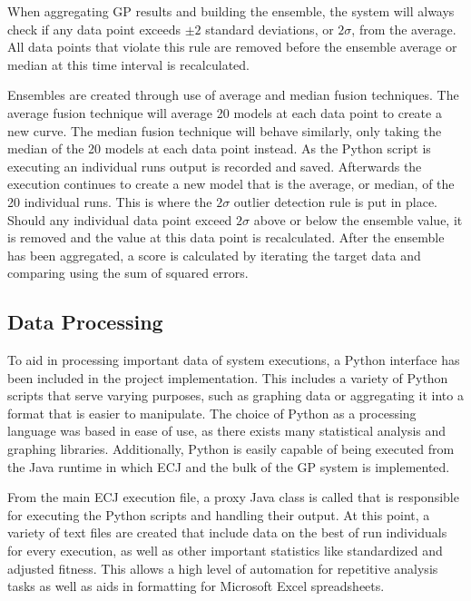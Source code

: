 \documentclass[12pt, letterpaper]{article}
\begin{document}
\textrm{ \indent When aggregating GP results and building the ensemble, the system will always check if any data point exceeds $\pm2$ standard deviations, or $2\sigma$, from the average. All data points that violate this rule are removed before the ensemble average or median at this time interval is recalculated. }

\textrm{ \indent Ensembles are created through use of average and median fusion techniques. The average fusion technique will average 20 models at each data point to create a new curve. The median fusion technique will behave similarly, only taking the median of the 20 models at each data point instead. As the Python script is executing an individual runs output is recorded and saved. Afterwards the execution continues to create a new model that is the average, or median, of the 20 individual runs. This is where the $2\sigma$ outlier detection rule is put in place. Should any individual data point exceed $2\sigma$ above or below the ensemble value, it is removed and the value at this data point is recalculated. After the ensemble has been aggregated, a score is calculated by iterating the target data and comparing using the sum of squared errors.}

\subsection{Data Processing}

\textrm{ \indent To aid in processing important data of system executions, a Python interface has been included in the project implementation. This includes a variety of Python scripts that serve varying purposes, such as graphing data or aggregating it into a format that is easier to manipulate. The choice of Python as a processing language was based in ease of use, as there exists many statistical analysis and graphing libraries. Additionally, Python is easily capable of being executed from the Java runtime in which ECJ and the bulk of the GP system is implemented. }

\textrm{ \indent From the main ECJ execution file, a proxy Java class is called that is responsible for executing the Python scripts and handling their output. At this point, a variety of text files are created that include data on the best of run individuals for every execution, as well as other important statistics like standardized and adjusted fitness. This allows a high level of automation for repetitive analysis tasks as well as aids in formatting for Microsoft Excel spreadsheets. }
\end{document}
